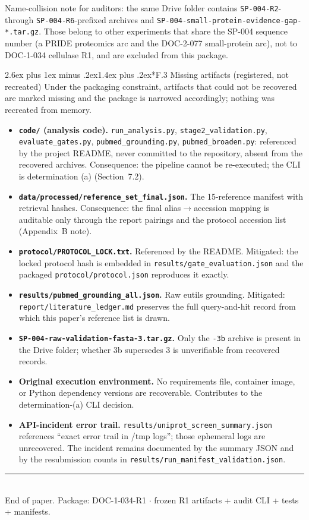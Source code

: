 \documentclass[11pt]{article}
\makeatletter
\renewcommand{\subsection}{\@startsection{subsection}{2}{\z@}%
  {2.6ex plus 1ex minus .2ex}{1.4ex plus .2ex}{\large\bfseries\color{navy}}}
\makeatother
\begin{document}
Name-collision note for auditors: the same Drive folder contains \texttt{SP-004-R2}- through \texttt{SP-004-R6}-prefixed archives and \texttt{SP-004-small-protein-evidence-gap-*.tar.gz}. Those belong to other experiments that share the SP-004 sequence number (a PRIDE proteomics arc and the DOC-2-077 small-protein arc), not to DOC-1-034 cellulase R1, and are excluded from this package.

\subsection*{F.3 Missing artifacts (registered, not recreated)}
Under the packaging constraint, artifacts that could not be recovered are marked missing and the package is narrowed accordingly; nothing was recreated from memory.

\begin{itemize}
\item \textbf{\texttt{code/} (analysis code).} \texttt{run\_analysis.py}, \texttt{stage2\_validation.py}, \texttt{evaluate\_gates.py}, \texttt{pubmed\_grounding.py}, \texttt{pubmed\_broaden.py}: referenced by the project README, never committed to the repository, absent from the recovered archives. Consequence: the pipeline cannot be re-executed; the CLI is determination (a) (Section~7.2).
\item \textbf{\texttt{data/processed/reference\_set\_final.json}.} The 15-reference manifest with retrieval hashes. Consequence: the final alias$\to$accession mapping is auditable only through the report pairings and the protocol accession list (Appendix~B note).
\item \textbf{\texttt{protocol/PROTOCOL\_LOCK.txt}.} Referenced by the README. Mitigated: the locked protocol hash is embedded in \texttt{results/gate\_evaluation.json} and the packaged \texttt{protocol/protocol.json} reproduces it exactly.
\item \textbf{\texttt{results/pubmed\_grounding\_all.json}.} Raw eutils grounding. Mitigated: \texttt{report/literature\_ledger.md} preserves the full query-and-hit record from which this paper's reference list is drawn.
\item \textbf{\texttt{SP-004-raw-validation-fasta-3.tar.gz}.} Only the \texttt{-3b} archive is present in the Drive folder; whether 3b supersedes 3 is unverifiable from recovered records.
\item \textbf{Original execution environment.} No requirements file, container image, or Python dependency versions are recoverable. Contributes to the determination-(a) CLI decision.
\item \textbf{API-incident error trail.} \texttt{results/uniprot\_screen\_summary.json} references ``exact error trail in /tmp logs''; those ephemeral logs are unrecovered. The incident remains documented by the summary JSON and by the resubmission counts in \texttt{results/run\_manifest\_validation.json}.
\end{itemize}

\vspace{1cm}
\begin{center}
{\color{navy}\rule{0.6\linewidth}{1.5pt}}\\[6pt]
{\small End of paper. Package: DOC-1-034-R1 $\cdot$ frozen R1 artifacts + audit CLI + tests + manifests.}
\end{center}
\end{document}
